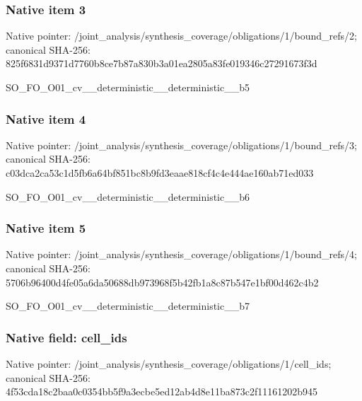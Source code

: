 \documentclass[10pt,a4paper]{article}
\begin{document}
\subsubsection{Native item 3}
Native pointer: /joint\_\allowbreak{}analysis/synthesis\_\allowbreak{}coverage/obligations/1/bound\_\allowbreak{}refs/2; canonical SHA-256: 825f6831d9371d7760b8ce7b87a830b3a01ea2805a83fe019346c27291673f3d

\begingroup\raggedright\sloppy SO\_\allowbreak{}FO\_\allowbreak{}O01\_\allowbreak{}cv\_\allowbreak{}\_\allowbreak{}deterministic\_\allowbreak{}\_\allowbreak{}deterministic\_\allowbreak{}\_\allowbreak{}b5\par\endgroup

\subsubsection{Native item 4}
Native pointer: /joint\_\allowbreak{}analysis/synthesis\_\allowbreak{}coverage/obligations/1/bound\_\allowbreak{}refs/3; canonical SHA-256: c03dca2ca53c1d5fb6a64bf851bc8b9fd3eaae818cf4c4e444ae160ab71ed033

\begingroup\raggedright\sloppy SO\_\allowbreak{}FO\_\allowbreak{}O01\_\allowbreak{}cv\_\allowbreak{}\_\allowbreak{}deterministic\_\allowbreak{}\_\allowbreak{}deterministic\_\allowbreak{}\_\allowbreak{}b6\par\endgroup

\subsubsection{Native item 5}
Native pointer: /joint\_\allowbreak{}analysis/synthesis\_\allowbreak{}coverage/obligations/1/bound\_\allowbreak{}refs/4; canonical SHA-256: 5706b96400d4fe05a6da50688db973968f5b42fb1a8c87b547e1bf00d462c4b2

\begingroup\raggedright\sloppy SO\_\allowbreak{}FO\_\allowbreak{}O01\_\allowbreak{}cv\_\allowbreak{}\_\allowbreak{}deterministic\_\allowbreak{}\_\allowbreak{}deterministic\_\allowbreak{}\_\allowbreak{}b7\par\endgroup

\subsubsection{Native field: cell\_\allowbreak{}ids}
Native pointer: /joint\_\allowbreak{}analysis/synthesis\_\allowbreak{}coverage/obligations/1/cell\_\allowbreak{}ids; canonical SHA-256: 4f53cda18c2baa0c0354bb5f9a3ecbe5ed12ab4d8e11ba873c2f11161202b945
\end{document}
